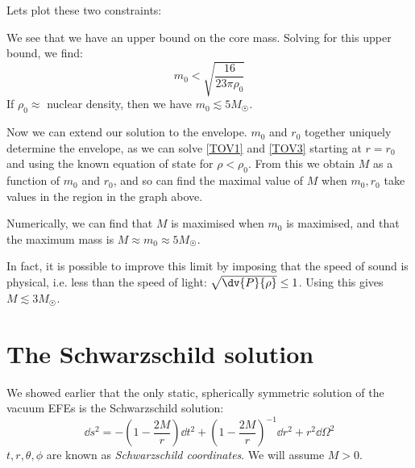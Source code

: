\documentclass{jknotes}
\begin{document}
Lets plot these two constraints:
\begin{figure}[H]
    \centering
\end{figure}
We see that we have an upper bound on the core mass. Solving for this upper bound, we find:
\begin{equation}
    m_0 < \sqrt{\frac{16}{23\pi\rho_0}}
\end{equation}
If \(\rho_0\approx\) nuclear density, then we have \(m_0 \lesssim 5M_{\astrosun}\).

Now we can extend our solution to the envelope. \(m_0\) and \(r_0\) together uniquely determine the envelope, as we can solve \eqref{TOV1} and \eqref{TOV3} starting at \(r=r_0\) and using the known equation of state for \(\rho<\rho_0\). From this we obtain \(M\) as a function of \(m_0\) and \(r_0\), and so can find the maximal value of \(M\) when \(m_0,r_0\) take values in the region in the graph above.

Numerically, we can find that \(M\) is maximised when \(m_0\) is maximised, and that the maximum mass is \(M\approx m_0\approx5M_{\astrosun}\).

In fact, it is possible to improve this limit by imposing that the speed of sound is physical, i.e. less than the speed of light: \(\sqrt{\dv{P}{\rho}}\le1\). Using this gives \(M \lesssim 3M_{\astrosun}\).

\section{The Schwarzschild solution}
We showed earlier that the only static, spherically symmetric solution of the vacuum EFEs is the Schwarzschild solution:
\begin{equation}
    \dd{s}^2 = - \left( 1-\frac{2M}{r} \right)\dd{t}^2 + \left( 1-\frac{2M}{r} \right)^{-1}\dd{r}^2 + r^2\dd{\Omega}^2
\end{equation}
\(t,r,\theta,\phi\) are known as \emph{Schwarzschild coordinates}. We will assume \(M>0\).
\end{document}
